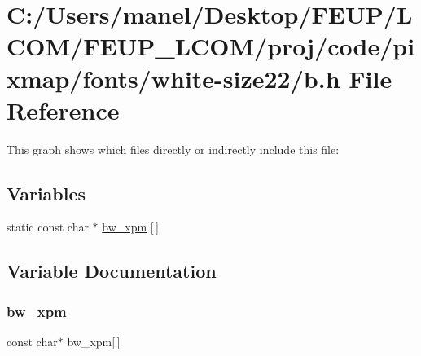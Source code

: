 \hypertarget{fonts_2white-size22_2b_8h}{}\section{C\+:/\+Users/manel/\+Desktop/\+F\+E\+U\+P/\+L\+C\+O\+M/\+F\+E\+U\+P\+\_\+\+L\+C\+O\+M/proj/code/pixmap/fonts/white-\/size22/b.h File Reference}
\label{fonts_2white-size22_2b_8h}
This graph shows which files directly or indirectly include this file\+:
\subsection*{Variables}
\begin{DoxyCompactItemize}
\item 
static const char $\ast$ \mbox{\hyperlink{fonts_2white-size22_2b_8h_a7a1f60a93d8c1032966cb027e3436e5d}{bw\+\_\+xpm}} \mbox{[}$\,$\mbox{]}
\end{DoxyCompactItemize}


\subsection{Variable Documentation}
\mbox{\label{fonts_2white-size22_2b_8h_a7a1f60a93d8c1032966cb027e3436e5d}} 
\subsubsection{\texorpdfstring{bw\_xpm}{bw\_xpm}}
{\footnotesize\ttfamily const char$\ast$ bw\+\_\+xpm\mbox{[}$\,$\mbox{]}\hspace{0.3cm}{\ttfamily [static]}}

